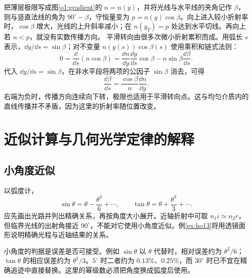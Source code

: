 把薄层极限写成图\ref{o1:gradient}的 $n=n(y)$，并将光线与水平线的夹角记作 $\beta$，则与竖直法线的角为 $90^\circ-\beta$，守恒量变为 $p=n(y)\cos\beta$。向上进入较小折射率时，$\cos\beta$ 增大，光线的上升斜率减小；在 $n(y_T)=p$ 处达到水平切线。再向上若 $n<p$，就没有实数传播方向。
平滑转向由很多次微小折射累积而成。用弧长 $s$ 表示，$\dd y/\dd s=\sin\beta$；对不变量 $n(y(s))\cos\beta(s)$ 使用乘积和链式法则：
\[
 0=\frac{\dd}{\dd s}(n\cos\beta)
 =\frac{\dd n}{\dd y}\frac{\dd y}{\dd s}\cos\beta
  -n\sin\beta\frac{\dd\beta}{\dd s}.
\]
代入 $\dd y/\dd s=\sin\beta$，在非水平段将两项的公因子 $\sin\beta$ 消去，可得
\[
\frac{\dd\beta}{\dd s}=\frac{\cos\beta}{n}\frac{\dd n}{\dd y}.
\]
右端为负时，传播方向连续向下转，极限也适用于平滑转向点。这与均匀介质内的直线传播并不矛盾，因为这里的折射率随位置改变。


\section{近似计算与几何光学定律的解释}

\subsection{小角度近似}

以弧度计，
\[
\sin\theta=\theta-\frac{\theta^3}{6}+\cdots,\qquad
\tan\theta=\theta+\frac{\theta^3}{3}+\cdots.
\]
应先画出光路并列出精确关系，再按角度大小展开。近轴折射中可取 $n_1i\simeq n_2r$，但临界光线的出射角接近 $90^\circ$，不能对它使用小角度近似。例\ref{ex:ho13}将用透镜面形说明精确光程与近轴结果的关系。

小角度的判据是误差是否可接受。例如 $\sin\theta$ 以 $\theta$ 代替时，相对误差约为 $\theta^2/6$；$\tan\theta$ 的相应误差约为 $\theta^2/3$。$5^\circ$ 时二者约为 $0.13\%$、$0.25\%$，而 $30^\circ$ 时已不宜在精确追迹中直接替换。这里的幂级数必须把角度换成弧度后使用。

